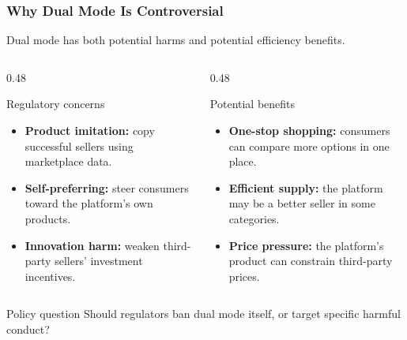 \begin{frame}
  \frametitle{Why Dual Mode Is Controversial}
  Dual mode has both potential harms and potential efficiency benefits.

  \begin{columns}[T,onlytextwidth]
    \begin{column}{0.48\textwidth}
      \begin{block}{Regulatory concerns}
        \begin{itemize}
          \item \textbf{Product imitation:} copy successful sellers using marketplace data.
          \item \textbf{Self-preferring:} steer consumers toward the platform's own products.
          \item \textbf{Innovation harm:} weaken third-party sellers' investment incentives.
        \end{itemize}
      \end{block}
    \end{column}
    \begin{column}{0.48\textwidth}
      \begin{block}{Potential benefits}
        \begin{itemize}
          \item \textbf{One-stop shopping:} consumers can compare more options in one place.
          \item \textbf{Efficient supply:} the platform may be a better seller in some categories.
          \item \textbf{Price pressure:} the platform's product can constrain third-party prices.
        \end{itemize}
      \end{block}
    \end{column}
  \end{columns}

  \begin{block}{Policy question}
    Should regulators ban dual mode itself, or target specific harmful conduct?
  \end{block}
\end{frame}


